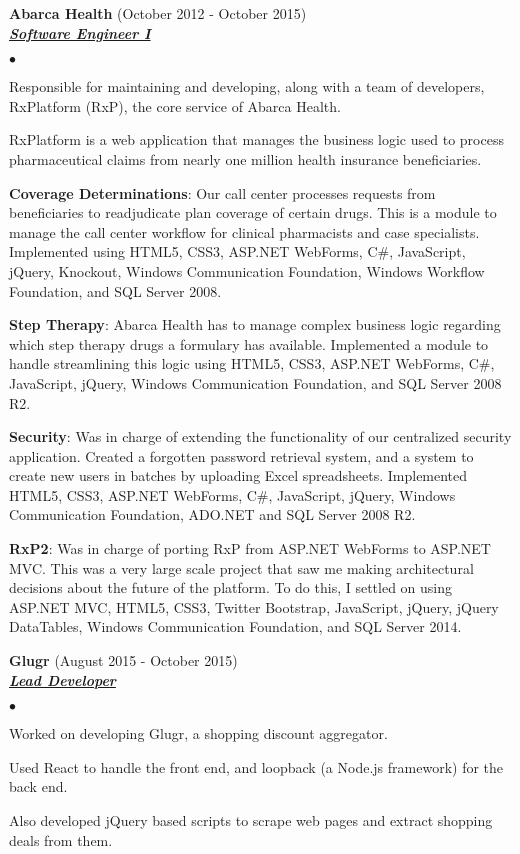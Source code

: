 \documentclass{article}
\newcommand{\employer}[3]{{ \textbf{#1} (#2)\\ \underline{\textbf{\emph{#3}}}\\  }}
\newenvironment{achievements}{\begin{list}{$\bullet$}{\topsep 0pt \itemsep -2pt}}{\vspace*{4pt}\end{list}}
\begin{document}
\employer{Abarca Health}{October 2012 - October 2015}{Software Engineer I}
	\begin{achievements}
	\item Responsible for maintaining and developing, along with a team of developers, RxPlatform (RxP), the core service of Abarca Health.
	\item RxPlatform is a web application that manages the business logic used to process pharmaceutical claims from nearly one million health insurance beneficiaries.
	\item \textbf{Coverage Determinations}: Our call center processes requests from beneficiaries to readjudicate plan coverage of certain drugs. This is a module to manage the call center workflow for clinical pharmacists and case specialists. Implemented using HTML5, CSS3, ASP.NET WebForms, C\string#, JavaScript, jQuery, Knockout, Windows Communication Foundation, Windows Workflow Foundation, and SQL Server 2008.
	\item \textbf{Step Therapy}: Abarca Health has to manage complex business logic regarding which step therapy drugs a formulary has available. Implemented a module to handle streamlining this logic using HTML5, CSS3, ASP.NET WebForms, C\string#, JavaScript, jQuery, Windows Communication Foundation, and SQL Server 2008 R2.
	\item \textbf{Security}: Was in charge of extending the functionality of our centralized security application. Created a forgotten password retrieval system, and a system to create new users in batches by uploading Excel spreadsheets. Implemented HTML5, CSS3, ASP.NET WebForms, C\string#, JavaScript, jQuery, Windows Communication Foundation, ADO.NET and SQL Server 2008 R2.
	\item \textbf{RxP2}: Was in charge of porting RxP from ASP.NET WebForms to ASP.NET MVC. This was a very large scale project that saw me making architectural decisions about the future of the platform. To do this, I settled on using ASP.NET MVC, HTML5, CSS3, Twitter Bootstrap, JavaScript, jQuery, jQuery DataTables, Windows Communication Foundation, and SQL Server 2014.
	\end{achievements}

\employer{Glugr}{August 2015 - October 2015}{Lead Developer}
	\begin{achievements}
	\item Worked on developing Glugr, a shopping discount aggregator.
	\item Used React to handle the front end, and loopback (a Node.js framework) for the back end.
	\item Also developed jQuery based scripts to scrape web pages and extract shopping deals from them. 
	\end{achievements}
\end{document}
